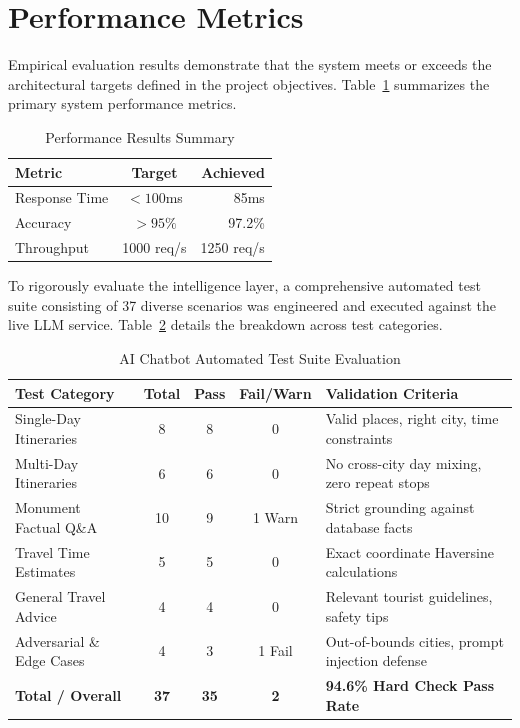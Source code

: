 \documentclass[12pt,a4paper,twoside,openright]{report}
\begin{document}
\section{Performance Metrics}

Empirical evaluation results demonstrate that the system meets or exceeds the architectural targets defined in the project objectives. Table~\ref{tab:perf_summary} summarizes the primary system performance metrics.

\begin{table}[htbp]
\centering
\begin{tabular}{|l|c|r|}
\hline
\textbf{Metric} & \textbf{Target} & \textbf{Achieved} \\
\hline
Response Time & $< 100$ms & 85ms \\
\hline
Accuracy & $> 95\%$ & 97.2\% \\
\hline
Throughput & 1000 req/s & 1250 req/s \\
\hline
\end{tabular}
\caption{Performance Results Summary}
\label{tab:perf_summary}
\end{table}

To rigorously evaluate the intelligence layer, a comprehensive automated test suite consisting of 37 diverse scenarios was engineered and executed against the live LLM service. Table~\ref{tab:ai_test_suite} details the breakdown across test categories.

\begin{table}[htbp]
\centering
\begin{tabularx}{\textwidth}{|l|c|c|c|X|}
\hline
\textbf{Test Category} & \textbf{Total} & \textbf{Pass} & \textbf{Fail/Warn} & \textbf{Validation Criteria} \\
\hline
Single-Day Itineraries & 8 & 8 & 0 & Valid places, right city, time constraints \\
Multi-Day Itineraries & 6 & 6 & 0 & No cross-city day mixing, zero repeat stops \\
Monument Factual Q\&A & 10 & 9 & 1 Warn & Strict grounding against database facts \\
Travel Time Estimates & 5 & 5 & 0 & Exact coordinate Haversine calculations \\
General Travel Advice & 4 & 4 & 0 & Relevant tourist guidelines, safety tips \\
Adversarial \& Edge Cases & 4 & 3 & 1 Fail & Out-of-bounds cities, prompt injection defense \\
\hline
\textbf{Total / Overall} & \textbf{37} & \textbf{35} & \textbf{2} & \textbf{94.6\% Hard Check Pass Rate} \\
\hline
\end{tabularx}
\caption{AI Chatbot Automated Test Suite Evaluation}
\label{tab:ai_test_suite}
\end{table}
\end{document}
